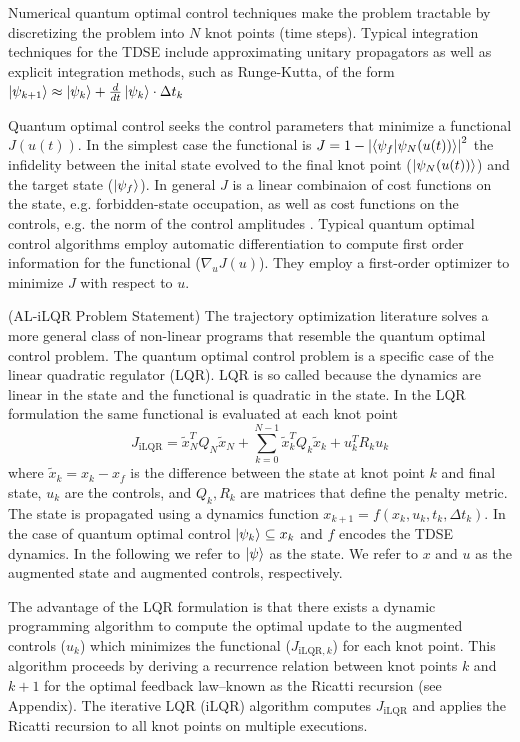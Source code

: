 \documentclass[
  amsfonts,
  amsmath,
  tbtags,
  amssymb,
  aps,
  nobibnotes,
  twocolumn,
]{revtex4-2}
\begin{document}
Numerical quantum optimal control techniques make
the problem tractable by discretizing the problem into $N$
knot points (time steps). Typical integration techniques for the TDSE include
approximating unitary propagators as well as explicit integration methods,
such as Runge-Kutta, of the form
$\ket{\psi_{k + 1}} \approx \ket{\psi_{k}} + \frac{d}{dt} \ket{\psi_{k}} \cdot \Delta t_{k}$

Quantum optimal control seeks the control
parameters that minimize a functional $J(u(t))$.
In the simplest case the functional is
$J = 1 - {\lvert \braket{\psi_{f} \lvert \psi_{N}(u(t))} \rvert}^{2}$
the infidelity between the inital state evolved
to the final knot point ($\ket{\psi_{N}(u(t))}$)
and the target state ($\ket{\psi_{f}}$). In general
$J$ is a linear combinaion of cost functions on the state, e.g.
forbidden-state occupation, as well as
cost functions on the controls, e.g. the norm of the control amplitudes
\cite{leung2017speedup}. Typical quantum optimal control
algorithms employ automatic differentiation
to compute first order information for the functional ($\nabla_{u} J(u)$).
They employ a first-order optimizer to minimize $J$ with respect to $u$.

(AL-iLQR Problem Statement) The trajectory optimization
literature solves a more general class of non-linear programs that resemble
the quantum optimal control problem. The quantum optimal control
problem is a specific case of the linear quadratic regulator (LQR).
LQR is so called because the dynamics are linear in the state and
the functional is quadratic in the state. In the LQR formulation
the same functional is evaluated at each knot point
\begin{equation}
  J_{\textrm{iLQR}} = \tilde{x}_{N}^{T} Q_{N} \tilde{x}_{N}
  + \sum_{k = 0}^{N - 1} \tilde{x}_{k}^{T} Q_{k} \tilde{x}_{k} + u_{k}^{T} R_{k} u_{k}
\end{equation}
where $\tilde{x}_{k} = x_{k} - x_{f}$ is the difference between the state
at knot point $k$ and final state, $u_{k}$ are the controls,
and $Q_{k}, R_{k}$ are matrices that define the penalty metric.
The state is propagated using a dynamics function
$x_{k + 1} = f(x_{k}, u_{k}, t_{k}, \Delta t_{k})$.
In the case of quantum optimal control $\ket{\psi_{k}} \subseteq x_{k}$
and $f$ encodes the TDSE dynamics. In the following
we refer to $\ket{\psi}$ as the state. We refer to $x$ and $u$ as
the augmented state and augmented controls, respectively.

The advantage of the LQR formulation
is that there exists a dynamic programming algorithm to compute the
optimal update to the augmented controls ($u_{k}$) which minimizes the functional
($J_{\textrm{iLQR}, k}$) for each knot point. This algorithm proceeds by deriving a
recurrence relation between knot points $k$ and $k + 1$ for the optimal
feedback law--known as the Ricatti recursion (see Appendix). The
iterative LQR (iLQR) algorithm computes $J_{\textrm{iLQR}}$
and applies the Ricatti recursion to all knot points on multiple
executions.
\end{document}
